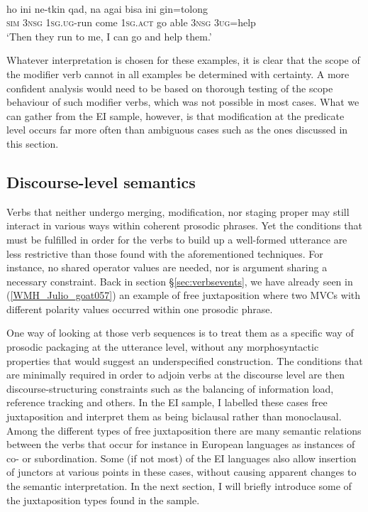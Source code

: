{\ea \label{Klon_61} 
\\
\gll ho ini ne-tkin qad, na agai bisa ini gin=tolong \\
\textsc{sim} 3\textsc{nsg} 1\textsc{sg}.\textsc{ug}-run come 1\textsc{sg}.\textsc{act} go able 3\textsc{nsg} 3\textsc{ug}=help \\
\glft `Then they run to me, I can go and help them.' \\ 
\z

Whatever interpretation is chosen for these examples, it is clear that the scope of the modifier verb cannot in all examples be determined with certainty. A more confident analysis would need to be based on thorough testing of the scope behaviour of such modifier verbs, which was not possible in most cases. What we can gather from the EI sample, however, is that modification at the predicate level occurs far more often than ambiguous cases such as the ones discussed in this section.

\subsection{Discourse-level semantics} \label{sec:discourse-level}

Verbs that neither undergo merging, modification, nor staging proper may still interact in various ways within coherent prosodic phrases. Yet the conditions that must be fulfilled in order for the verbs to build up a well-formed utterance are less restrictive than those found with the aforementioned techniques. For instance, no shared operator values are needed, nor is argument sharing a necessary constraint. Back in section §\ref{sec:verbsevents}, we have already seen in (\ref{WMH_Julio_goat057}) an example of free juxtaposition where two MVCs with different polarity values occurred within one prosodic phrase. 

One way of looking at those verb sequences is to treat them as a specific way of prosodic packaging at the utterance level, without any morphosyntactic properties that would suggest an underspecified construction. The conditions that are minimally required in order to adjoin verbs at the discourse level are then discourse-structuring constraints such as the balancing of information load, reference tracking and others. In the EI sample, I labelled these cases free juxtaposition and interpret them as being biclausal rather than monoclausal. Among the different types of free juxtaposition there are many semantic relations between the verbs that occur for instance in European languages as instances of co- or subordination. Some (if not most) of the EI languages also allow insertion of junctors at various points in these cases, without causing apparent changes to the semantic interpretation. In the next section, I will briefly introduce some of the juxtaposition types found in the sample.

}
